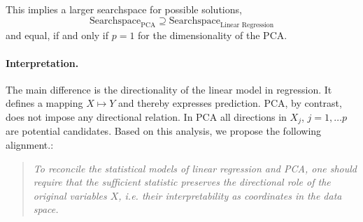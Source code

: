 This implies a larger searchspace for possible solutions, 
\[ \text{Searchspace}_{\text{PCA}} \supseteq \text{Searchspace}_{\text{Linear Regression}} \]
and equal, if and only if $p=1$ for the dimensionality of the PCA.

\paragraph{Interpretation.}
The main difference is the directionality of the linear model in regression. It defines a mapping $X \mapsto Y$ and thereby expresses prediction. PCA, by contrast, does not impose any directional relation. In PCA all directions in $X_j$, $j = 1, \dots p$ are potential candidates. Based on this analysis, we propose the following alignment.:

\begin{quote}
\textit{To reconcile the statistical models of linear regression and PCA, one should require that the sufficient statistic preserves the directional role of the original variables $X$, i.e. their interpretability as coordinates in the data space.}
\end{quote}
